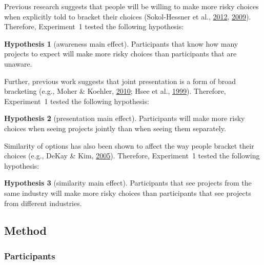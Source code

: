\documentclass[
  english,
  man, donotrepeattitle,floatsintext]{apa7}
\theoremstyle{definition}
\theoremstyle{definition}
\theoremstyle{definition}
\theoremstyle{definition}
\newtheorem{hypothesis}{Hypothesis}
\theoremstyle{remark}
\begin{document}
Previous research suggests that people will be willing to make more risky
choices when explicitly told to bracket their choices (Sokol-Hessner et al., \protect\hyperlink{ref-sokolhessner2012}{2012}, \protect\hyperlink{ref-sokolhessner2009}{2009}). Therefore, Experiment~1 tested the following hypothesis:

\begin{hypothesis}[awareness main effect]
\protect\hypertarget{hyp:awareness-aggregation-1}{}{\label{hyp:awareness-aggregation-1} \iffalse (awareness main effect) \fi{} }Participants that know how many projects to expect will make more risky choices
than participants that are unaware.
\end{hypothesis}

Further, previous work suggests that joint presentation is a form of broad
bracketing (e.g., Moher \& Koehler, \protect\hyperlink{ref-moher2010}{2010}; Hsee et al., \protect\hyperlink{ref-hsee1999}{1999}). Therefore, Experiment~1 tested the
following hypothesis:

\begin{hypothesis}[presentation main effect]
\protect\hypertarget{hyp:presentation-aggregation-1}{}{\label{hyp:presentation-aggregation-1} \iffalse (presentation main effect) \fi{} }Participants will make more risky choices when seeing projects jointly than when
seeing them separately.
\end{hypothesis}

Similarity of options has also been shown to affect the way people bracket their
choices (e.g., DeKay \& Kim, \protect\hyperlink{ref-dekay2005}{2005}). Therefore, Experiment~1 tested the following hypothesis:

\begin{hypothesis}[similarity main effect]
\protect\hypertarget{hyp:similarity-aggregation-1}{}{\label{hyp:similarity-aggregation-1} \iffalse (similarity main effect) \fi{} }Participants that see projects from the same industry will make more risky
choices than participants that see projects from different industries.
\end{hypothesis}

\hypertarget{method}{%
\subsection{Method}\label{method}}

\hypertarget{participants}{%
\subsubsection{Participants}\label{participants}}
\end{document}
